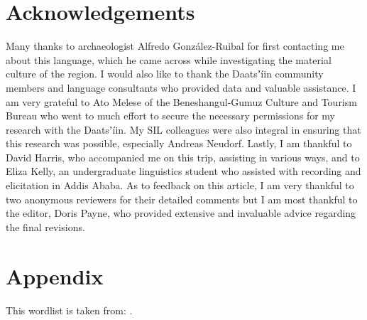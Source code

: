 \documentclass[output=paper]{langsci/langscibook}
\begin{document}
\section*{Acknowledgements}

Many thanks to archaeologist Alfredo González-Ruibal for first contacting me about this language, which he came across while investigating the material culture of the region. I would also like to thank the Daatsʼíin community members and language consultants who provided data and valuable assistance. I am very grateful to Ato Melese of the Beneshangul-Gumuz Culture and Tourism Bureau who went to much effort to secure the necessary permissions for my research with the Daatsʼíin. My SIL colleagues were also integral in ensuring that this research was possible, especially Andreas Neudorf. Lastly, I am thankful to David Harris, who accompanied me on this trip, assisting in various ways, and to Eliza Kelly, an undergraduate linguistics student who assisted with recording and elicitation in Addis Ababa. As to feedback on this article, I am very thankful to two anonymous reviewers for their detailed comments but I am most thankful to the editor, Doris Payne, who provided extensive and invaluable advice regarding the final revisions.

\section*{Appendix}

This wordlist is taken from: \citet{HaspelmathTadmor2009}.
\end{document}
